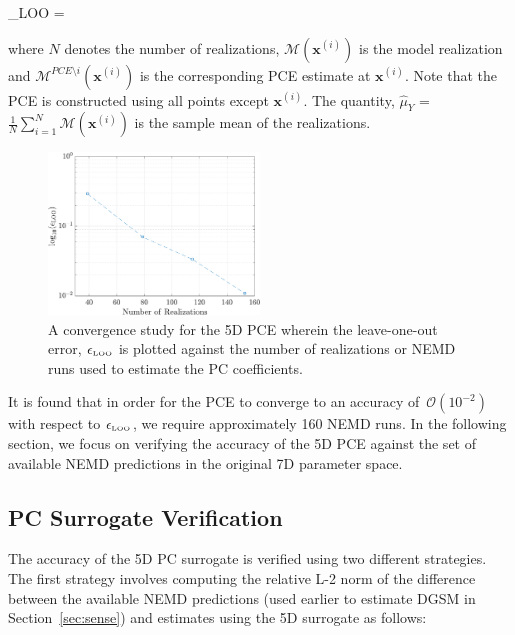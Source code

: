 \be
\epsilon_{\tiny{\mbox{LOO}}} = 
\label{eq:loo}
\ee 

\noindent where $N$ denotes the number of realizations, $\mathcal{M}(\bm{x}^{(i)})$ is the
model realization and $\mathcal{M}^{PCE\setminus i}(\bm{x}^{(i)})$ is the corresponding PCE estimate
at $\bm{x}^{(i)}$. Note that the PCE is constructed using all points except $\bm{x}^{(i)}$.
The quantity, $\hat{\mu}_Y$ = $\frac{1}{N}\sum\limits_{i=1}^{N}\mathcal{M}(\bm{x}^{(i)})$
is the sample mean of the realizations.

\begin{figure}[htbp]
 \begin{center}
  \includegraphics[width=0.5\textwidth]{./Figures/PCE5D_eloo}
\caption{A convergence study for the 5D PCE wherein the leave-one-out
error, $\epsilon_{\tiny{\mbox{LOO}}}$ is plotted against the number of
realizations or NEMD runs used to estimate the PC coefficients.}
\label{fig:loo}
\end{center}
\end{figure}
 
It is found that in order for the PCE to converge to an accuracy of~$\mathcal{O}(10^{-2})$
with respect to $\epsilon_{\tiny{\mbox{LOO}}}$, we require approximately 160 NEMD runs. In the
following section, we focus on verifying the accuracy of the 5D PCE against the set of available
NEMD predictions in the original 7D parameter space. 

\subsection{PC Surrogate Verification}

The accuracy of the 5D PC surrogate is verified using two different strategies. The first strategy involves
computing the relative L-2 norm of the difference between the available NEMD predictions (used earlier
to estimate DGSM in Section~\ref{sec:sense}) and estimates using the 5D surrogate as follows:

